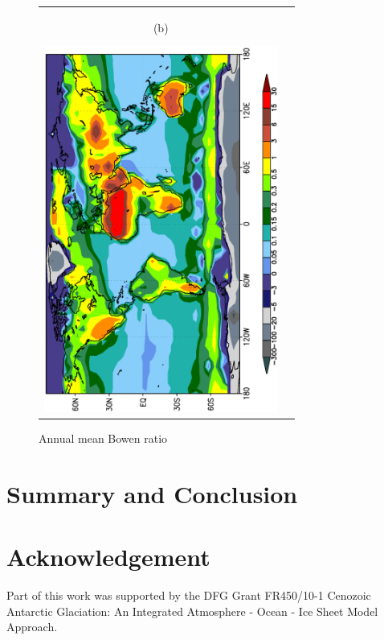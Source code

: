 \documentclass[12pt,a4paper,twoside,openright,headinclude,liststotoc,bibtotoc]{scrreprt}
\begin{document}
\begin{figure}[b]
\begin{tabular}{cc}
\begin{minipage}{1.0\textwidth}
\begin{center}
\begin{scriptsize}(b)\end{scriptsize}\hspace{-1cm}\includegraphics[height=12.0cm,angle=-90]{eps/zonalt21tmbowen.eps}
\end{center}
\end{minipage}
\end{tabular}
\caption[Bowen ratio]{Annual mean Bowen ratio}
\label{img:bowen}
\end{figure}

\vspace{-0.4cm}
\chapter{Summary and Conclusion}
\vspace{-0.4cm}


\vspace{-0.4cm}
\chapter{Acknowledgement}
\vspace{-0.4cm}
Part of this work was supported by the DFG Grant FR450/10-1
Cenozoic Antarctic Glaciation:
An Integrated Atmosphere - Ocean - Ice Sheet Model Approach.



\end{document}

